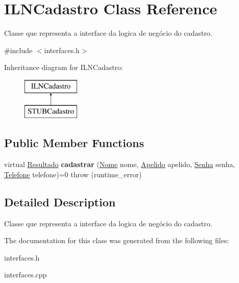 \hypertarget{classILNCadastro}{}\section{I\+L\+N\+Cadastro Class Reference}
\label{classILNCadastro}


Classe que representa a interface da logica de negócio do cadastro.  




{\ttfamily \#include $<$interfaces.\+h$>$}

Inheritance diagram for I\+L\+N\+Cadastro\+:\begin{figure}[H]
\begin{center}
\leavevmode
\includegraphics[height=2.000000cm]{classILNCadastro}
\end{center}
\end{figure}
\subsection*{Public Member Functions}
\begin{DoxyCompactItemize}
\item 
\mbox{\label{classILNCadastro_a8a13b3169f6256ef2341ca13f32772b7}} 
virtual \hyperlink{classResultado}{Resultado} {\bfseries cadastrar} (\hyperlink{classNome}{Nome} nome, \hyperlink{classApelido}{Apelido} apelido, \hyperlink{classSenha}{Senha} senha, \hyperlink{classTelefone}{Telefone} telefone)=0  throw (runtime\+\_\+error)
\end{DoxyCompactItemize}


\subsection{Detailed Description}
Classe que representa a interface da logica de negócio do cadastro. 

The documentation for this class was generated from the following files\+:\begin{DoxyCompactItemize}
\item 
interfaces.\+h\item 
interfaces.\+cpp\end{DoxyCompactItemize}
